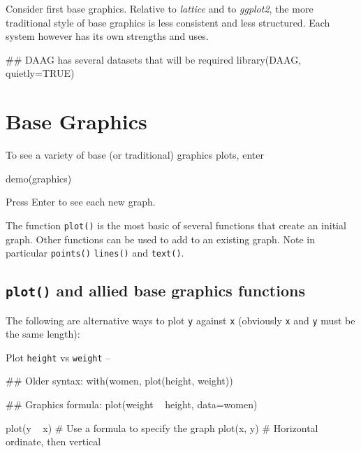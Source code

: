 \documentclass{tufte-book}\usepackage[]{graphicx}\usepackage[]{color}
\newcommand{\txtt}[1]{\texttt{#1}}
\newcommand{\margtt}[1]{{\footnotesize \texttt{#1}}}
\begin{document}
Consider first base graphics.  Relative to {\em lattice} and to {\em
  ggplot2}, the more traditional style of base graphics is less
consistent and less structured.  Each system however has its own
strengths and uses.

\begin{Schunk}
\begin{Sinput}
## DAAG has several datasets that will be required
library(DAAG, quietly=TRUE)
\end{Sinput}
\end{Schunk}

\section{Base Graphics}\label{sec:baseplots}

\begin{marginfigure}
  To see a variety of base (or traditional) graphics plots, enter\\[-4pt]
\begin{Schunk}
\begin{Sinput}
demo(graphics)
\end{Sinput}
\end{Schunk}
\noindent Press Enter to see each new graph.
\end{marginfigure}

The function \txtt{plot()} is the most basic of several functions that
create an initial graph. Other functions can be used to add to an
existing graph. Note in particular \txtt{points()} \txtt{lines()} and
\txtt{text()}.

\subsection{\txtt{plot()} and allied base graphics functions}
The following are alternative ways to plot \txtt{y} against \txtt{x}
(obviously \txtt{x} and \txtt{y} must be the same length):

\begin{marginfigure}[-3pt]
Plot \margtt{height} vs \margtt{weight} --\\
\begin{Schunk}
\begin{Sinput}
## Older syntax:
with(women,
     plot(height, weight))
\end{Sinput}
\end{Schunk}
\begin{Schunk}
\begin{Sinput}
## Graphics formula:
plot(weight ~ height,
     data=women)
\end{Sinput}
\end{Schunk}
\end{marginfigure}
\begin{Schunk}
\begin{Sinput}
plot(y ~ x)   # Use a formula to specify the graph
plot(x, y)    # Horizontal ordinate, then vertical
\end{Sinput}
\end{Schunk}
\end{document}
